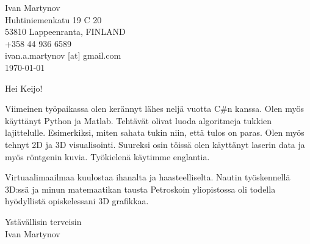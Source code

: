 \documentclass[]{article}
\begin{document}
\begin{flushright}
	Ivan Martynov\\
	Huhtiniemenkatu 19 C 20\\
	53810 Lappeenranta, FINLAND\\
	+358 44 936 6589\\
	ivan.a.martynov [at] gmail.com\\
	\today
\end{flushright}

\noindent
Hei Keijo!
\bigskip

\noindent
Viimeinen ty\"opaikassa olen ker\"annyt l\"ahes nelj\"a vuotta C\#n kanssa. Olen my\"os k\"aytt\"anyt Python ja Matlab. Teht\"av\"at olivat luoda algoritmeja tukkien lajittelulle. Esimerkiksi, miten sahata tukin niin, ett\"a tulos on paras. Olen my\"os tehnyt 2D ja 3D visualisointi. Suureksi osin t\"oiss\"a olen k\"aytt\"anyt laserin data ja my\"os r\"ontgenin kuvia. Ty\"okielen\"a k\"aytimme englantia.

Virtuaalimaailmaa kuulostaa ihanalta ja haasteelliselta. Nautin ty\"oskennell\"a 3D:ss\"a ja minun matemaatikan tausta Petroskoin yliopistossa oli todella hy\"odyllist\"a opiskelessani 3D grafikkaa.

\bigskip
\noindent Yst\"av\"allisin terveisin\\
Ivan Martynov
\end{document}
